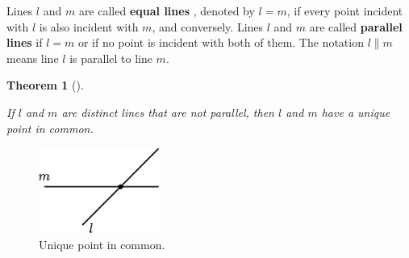\documentclass[
  letterpaper,
  10pt,
  reqno,
  twopage,
  openany]{book}
\theoremstyle{plain}
\theoremstyle{definition}
\theoremstyle{definition}
\theoremstyle{definition}
\theoremstyle{plain}
\theoremstyle{plain}
\newtheorem{theorem}{Theorem}[chapter]
\theoremstyle{remark}
\begin{document}
Lines \(l\) and \(m\) are called  \textbf{equal
lines} , denoted by \(l=m\), if every point incident with \(l\) is also
incident with \(m\), and conversely. Lines \(l\) and \(m\) are called
 \textbf{parallel lines} if \(l=m\) or if no point
is incident with both of them. The notation \(l\parallel m\) means line
\(l\) is parallel to line \(m\).

\leavevmode{}%
\begin{theorem}[]\label{thm-incidence1}

If \(l\) and \(m\) are distinct lines that are not parallel, then \(l\)
and \(m\) have a unique point in common.

\end{theorem}

\begin{figure}

{\centering \includegraphics[width=1.5625in,height=\textheight]{./images/incidence-geometry-1-pics.png}

}

\caption{\label{fig-notpar}Unique point in common.}

\end{figure}
\end{document}
